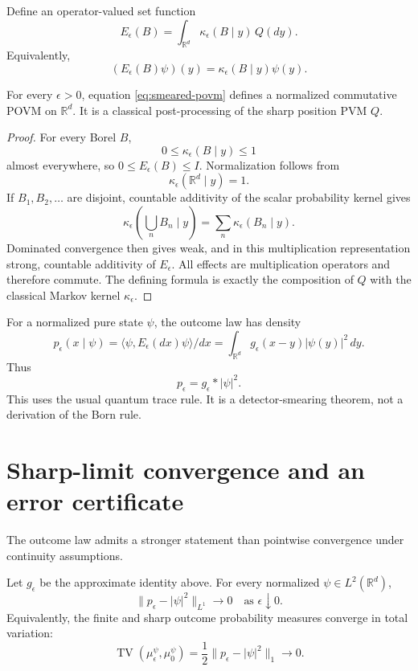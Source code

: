 \documentclass[11pt]{article}
\newcommand{\TV}{\operatorname{TV}}
\begin{document}
Define an operator-valued set function
\begin{equation}
E_\epsilon(B)
=\int_{\mathbb R^d}
\kappa_\epsilon(B\mid y)\,Q(dy).
\label{eq:smeared-povm}
\end{equation}
Equivalently,
\[
(E_\epsilon(B)\psi)(y)
=\kappa_\epsilon(B\mid y)\psi(y).
\]

\begin{theorem}
\label{thm:smearing}
For every \(\epsilon>0\), equation \eqref{eq:smeared-povm}
defines a normalized commutative POVM on \(\mathbb R^d\). It is a classical
post-processing of the sharp position PVM \(Q\).
\end{theorem}

\begin{proof}
For every Borel \(B\),
\[
0\leq\kappa_\epsilon(B\mid y)\leq1
\]
almost everywhere, so \(0\leq E_\epsilon(B)\leq I\). Normalization follows
from
\[
\kappa_\epsilon(\mathbb R^d\mid y)=1.
\]
If \(B_1,B_2,\ldots\) are disjoint, countable additivity of the scalar
probability kernel gives
\[
\kappa_\epsilon\!\left(\bigcup_nB_n\mid y\right)
=\sum_n\kappa_\epsilon(B_n\mid y).
\]
Dominated convergence then gives weak, and in this multiplication
representation strong, countable additivity of \(E_\epsilon\). All effects
are multiplication operators and therefore commute. The defining formula is
exactly the composition of \(Q\) with the classical Markov kernel
\(\kappa_\epsilon\).
\end{proof}

For a normalized pure state \(\psi\), the outcome law has density
\begin{equation}
p_\epsilon(x\mid\psi)
=\langle\psi,E_\epsilon(dx)\psi\rangle/dx
=\int_{\mathbb R^d}
g_\epsilon(x-y)|\psi(y)|^2\,dy.
\label{eq:blurred-density}
\end{equation}
Thus
\[
p_\epsilon=g_\epsilon*|\psi|^2.
\]
This uses the usual quantum trace rule. It is a detector-smearing theorem,
not a derivation of the Born rule.

\section{Sharp-limit convergence and an error certificate}

The outcome law admits a stronger statement than pointwise convergence under
continuity assumptions.

\begin{theorem}
\label{thm:tv-limit}
Let \(g_\epsilon\) be the approximate identity above. For every normalized
\(\psi\in L^2(\mathbb R^d)\),
\[
\|p_\epsilon-|\psi|^2\|_{L^1}\longrightarrow0
\quad\text{as }\epsilon\downarrow0.
\]
Equivalently, the finite and sharp outcome probability measures converge in
total variation:
\[
\TV(\mu_\epsilon^\psi,\mu_0^\psi)
=\frac12\|p_\epsilon-|\psi|^2\|_1
\longrightarrow0.
\]
\end{theorem}
\end{document}
